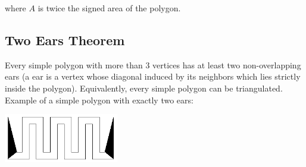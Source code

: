 where $A$ is twice the signed area of the polygon.

\subsection{Two Ears Theorem}

Every simple polygon with more than 3 vertices has at least two non-overlapping ears (a ear is a vertex whose diagonal induced by its neighbors which lies strictly inside the polygon). Equivalently, every simple polygon can be triangulated. Example of a simple polygon with exactly two ears:

\begin{center}
    \includegraphics[width=5cm]{img/two_ears.png}
    \end{center}